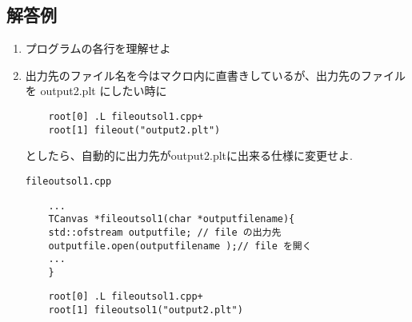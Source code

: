   \subsection{解答例}
  \begin{enumerate}
   \item プログラムの各行を理解せよ

   \item  出力先のファイル名を今はマクロ内に直書きしているが、出力先のファイルを output2.plt にしたい時に
\begin{verbatim}
	root[0] .L fileoutsol1.cpp+
	root[1] fileout("output2.plt") 
\end{verbatim}
	  としたら、自動的に出力先がoutput2.pltに出来る仕様に変更せよ.

	  \begin{itembox}{\texttt{fileoutsol1.cpp}}
\begin{verbatim}
	...
	TCanvas *fileoutsol1(char *outputfilename){
	std::ofstream outputfile; // file の出力先
	outputfile.open(outputfilename );// file を開く
	...
	}
\end{verbatim}
	  \end{itembox}

\begin{verbatim}
	root[0] .L fileoutsol1.cpp+
	root[1] fileoutsol1("output2.plt") 
\end{verbatim} 

  \end{enumerate}